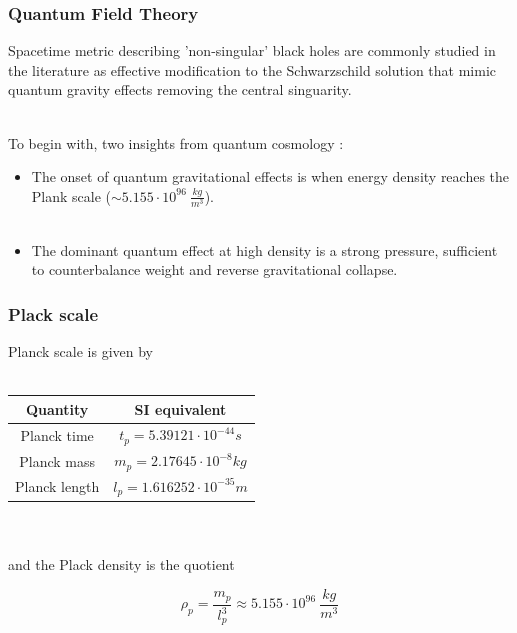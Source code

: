 \documentclass{beamer}
\begin{document}
\begin{frame}
\frametitle{Quantum Field Theory}
Spacetime metric describing 'non-singular' black holes are commonly studied in the literature \cite{effective,planck stars} as effective modification to the Schwarzschild solution that mimic quantum gravity effects removing the central singuarity.\\\

To begin with, two insights from quantum cosmology \cite{ashtekar}:

\begin{itemize}
\item The onset of quantum gravitational effects is when energy density reaches the Plank scale ($\sim 5.155 \cdot 10^{96}\ \frac{kg}{m^3}$).\\\

\item The dominant quantum effect at high density is a strong pressure, sufficient to counterbalance weight and reverse gravitational collapse.
\end{itemize} 
\end{frame}

\begin{frame}
\frametitle{Plack scale}

Planck scale is given by\\\	
\begin{center}
	\begin{tabular}{| c | c |}
    \hline
    \textbf{Quantity} & \textbf{SI equivalent} \\ \hline
    Planck time & $t_{p} = 5.39121 \cdot 10^{-44} s$\\ \hline
    Planck mass & $m_{p} = 2.17645 \cdot 10^{-8} kg$\\ \hline
    Planck length & $l_{p} = 1.616252 \cdot 10^{-35} m$\\ \hline
    \end{tabular}
\end{center}
\
\\
\
\\

and the Plack density is the quotient

\begin{equation}
\rho _{p} = \frac{m_{p}}{l_{p}^3} \approx 5.155 \cdot 10^{96}\ \frac{kg}{m^3}
\end{equation}
\end{frame}
\end{document}
